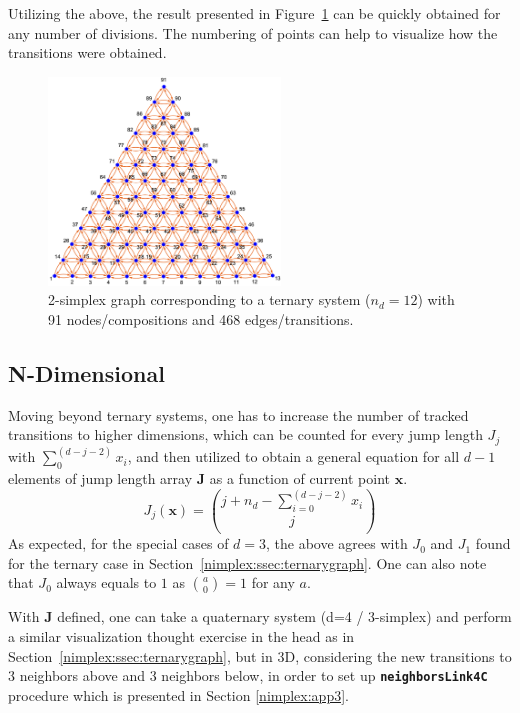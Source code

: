 Utilizing the above, the result presented in Figure~\ref{nimplex:fig:ternarysimplexgraph} can be quickly obtained for any number of divisions. The numbering of points can help to visualize how the transitions were obtained.

\begin{figure}[h]
    \centering
    \includegraphics[width=0.55\textwidth]{nimplex/SimplexGraphTernaryBlue.png}
    \caption{2-simplex graph corresponding to a ternary system ($n_d=12$) with 91 nodes/compositions and 468 edges/transitions.} 
    \label{nimplex:fig:ternarysimplexgraph}
\end{figure}

\subsection{N-Dimensional} \label{nimplex:ssec:ndimgraph}

Moving beyond ternary systems, one has to increase the number of tracked transitions to higher dimensions, which can be counted for every jump length $J_j$ with $\sum_0^{(d-j-2)}x_i$, and then utilized to obtain a general equation for all $d-1$ elements of jump length array $\textbf{J}$ as a function of current point $\textbf{x}$.
\begin{equation}
    J_{j}(\textbf{x})= \binom{j+n_d- \sum_{i=0}^{(d-j-2)} x_i}{j}
    \label{nimplex:eq:jj}
\end{equation}
As expected, for the special cases of $d=3$, the above agrees with $J_0$ and $J_1$ found for the ternary case in Section~\ref{nimplex:ssec:ternarygraph}. One can also note that $J_0$ always equals to $1$ as $\binom{a}{0} = 1$ for any $a$.

With $\textbf{J}$ defined, one can take a quaternary system (d=4 / 3-simplex) and perform a similar visualization thought exercise in the head as in Section~\ref{nimplex:ssec:ternarygraph}, but in 3D, considering the new transitions to 3 neighbors above and 3 neighbors below, in order to set up \texttt{\textbf{neighborsLink4C}} procedure which is presented in Section \ref{nimplex:app3}. 

